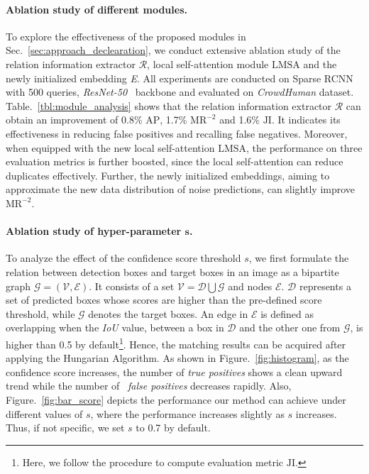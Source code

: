 \documentclass[final]{cvpr}
\begin{document}
\vspace{-0.5cm}
\paragraph{Ablation study of different modules.}
To explore the effectiveness of the proposed modules in Sec.~\ref{sec:approach_declearation}, we conduct extensive ablation study of the relation information extractor $\mathcal{R}$, local self-attention module $\text{LMSA}$ and the newly initialized embedding \emph{E}. All experiments are conducted on Sparse RCNN~\cite{sun2020sparse} with 500 queries, \emph{ResNet-50}~\cite{he2016deep} backbone and evaluated on \emph{CrowdHuman} dataset. Table.~\ref{tbl:module_analysis} shows that the relation information extractor $\mathcal{R}$ can obtain an improvement of 0.8\% $\text{AP}$, 1.7\% $\text{MR}^{-2}$ and 1.6\% $\text{JI}$. It indicates its effectiveness in reducing false positives and recalling false negatives. Moreover, when equipped with the new local self-attention $\text{LMSA}$, the performance on three evaluation metrics is further boosted, since the local self-attention can reduce duplicates effectively. Further, the newly initialized embeddings, aiming to approximate the new data distribution of noise predictions, can slightly improve $\text{MR}^{-2}$.

\vspace{-0.5cm}
\paragraph{Ablation study of hyper-parameter $\textbf{s}$.}
To analyze the effect of the confidence score threshold $s$, we first formulate the relation between detection boxes and target boxes in an image as a bipartite graph $\mathcal{G}=(\mathcal{V},\mathcal{E})$. It consists of a set $\mathcal{V} = \mathcal{D} \bigcup \mathcal{G}$ and nodes $\mathcal{E}$. $\mathcal{D}$ represents a set of predicted boxes whose scores are higher than the pre-defined score threshold, while $\mathcal{G}$ denotes the target boxes. An edge in $\mathcal{E}$ is defined as overlapping when the \emph{IoU} value, between a box in $\mathcal{D}$ and the other one from $\mathcal{G}$, is higher than 0.5 by default\footnote{Here, we follow the procedure to compute evaluation metric $\text{JI}$.}. Hence, the matching results can be acquired after applying the Hungarian Algorithm. As shown in Figure.~\ref{fig:histogram}, as the confidence score increases, the number of \textit{true positives} shows a clean upward trend while the number of ~\textit{false positives} decreases rapidly. Also, Figure.~\ref{fig:bar_score} depicts the performance our method can achieve under different values of $s$, where the performance increases slightly as $s$ increases. Thus, if not specific, we set $s$ to 0.7 by default.
\end{document}
